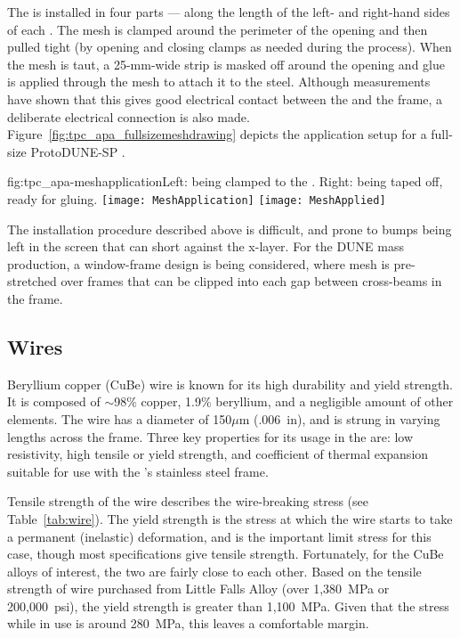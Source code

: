 The  is installed in four parts --- along the length of the left- and right-hand sides of each  . The mesh is clamped around the perimeter of the opening and then pulled tight (by opening and closing clamps as needed during the process).  When the mesh is taut, a 25-mm-wide strip is masked off around the opening and glue is applied through the mesh to attach it to the steel.  Although measurements have shown that this gives good electrical contact between the  and the frame, a deliberate electrical connection is also made.  Figure~\ref{fig:tpc_apa_fullsizemeshdrawing} depicts the  application setup for a full-size ProtoDUNE-SP  .

\begin{dunefigure}{fig:tpc_apa-meshapplication}{Left:  being clamped to the  . Right:  being taped off, ready for gluing.}
\texttt{[image: MeshApplication]} 
\texttt{[image: MeshApplied]} 
\end{dunefigure}

The  installation procedure described above is difficult, and prone to bumps being left in the screen that can short against the x-layer. For the DUNE mass production, a window-frame design is being considered, where mesh is pre-stretched over frames that can be clipped into each gap between cross-beams in the   frame.

\subsection{Wires}
\label{sec:fdsp-apa-wires}

Beryllium copper (CuBe) wire is known for its high durability and yield strength. It is composed of $\sim$98$\%$ copper, 1.9$\%$ beryllium, and a negligible amount of other elements. The   wire has a diameter of 150$\mu$m (.006~in), and is strung in varying lengths across the   frame. Three key properties for its usage in the   are: low resistivity, high tensile or yield strength, and coefficient of thermal expansion suitable for use with the  's stainless steel frame.

Tensile strength of the wire describes the wire-breaking stress (see Table~\ref{tab:wire}).  The yield strength is the stress at which the wire starts to take a permanent (inelastic) deformation, and is the important limit stress for this case, though most specifications give tensile strength.  Fortunately, for the CuBe alloys of interest, the two are fairly close to each other.  Based on the tensile strength of wire purchased from Little Falls Alloy (over 1,380~MPa or 200,000~psi), the yield strength is greater than 1,100~MPa.  Given that the stress while in use is around 280~MPa, this leaves a comfortable margin.

